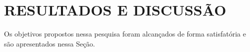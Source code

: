 \chapter{RESULTADOS E DISCUSSÃO}

Os objetivos propostos nessa pesquisa foram alcançados de forma satisfatória e são apresentados nessa Seção.

